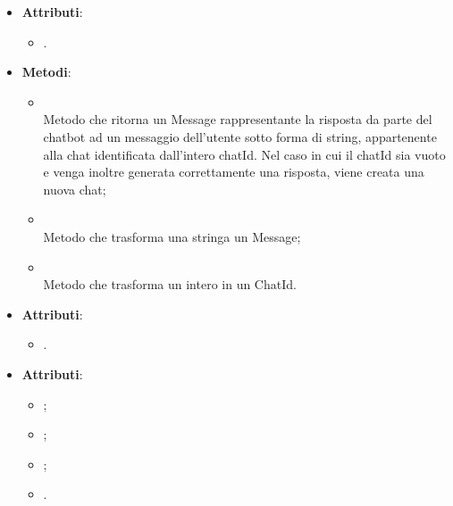 \documentclass[10pt, a4paper]{article}
\begin{document}
\label{AskChatbotControllerDettaglio}
\begin{itemize}
    \item \textbf{Attributi}:
    \begin{itemize}
        \item {}.
    \end{itemize}
    \item \textbf{Metodi}:
    \begin{itemize}
        \item {}\\
        Metodo che ritorna un Message rappresentante la risposta da parte del chatbot ad un messaggio dell'utente sotto forma di string, appartenente alla chat identificata dall'intero chatId. Nel caso in cui il chatId sia vuoto e venga inoltre generata correttamente una risposta, viene creata una nuova chat;
        \item {}\\
        Metodo che trasforma una stringa un Message;
        \item {}\\
        Metodo che trasforma un intero in un ChatId.
    \end{itemize}
\end{itemize}

\label{ChatIdDettaglio}
\begin{itemize}
    \item \textbf{Attributi}:
    \begin{itemize}
        \item {}.
    \end{itemize}
\end{itemize}

\label{MessageDettaglio}
\begin{itemize}
    \item \textbf{Attributi}:
    \begin{itemize}
        \item {};
        \item {};
        \item {};
        \item {}.
    \end{itemize}
\end{itemize}
\end{document}
